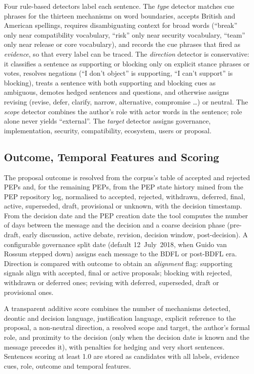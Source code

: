 \documentclass[sigconf,screen]{acmart}
\begin{document}
Four rule-based detectors label each sentence. The \emph{type} detector matches cue phrases for the thirteen mechanisms on word boundaries, accepts British and American spellings, requires disambiguating context for broad words (``break'' only near compatibility vocabulary, ``risk'' only near security vocabulary, ``team'' only near release or core vocabulary), and records the cue phrases that fired as \emph{evidence}, so that every label can be traced. The \emph{direction} detector is conservative: it classifies a sentence as supporting or blocking only on explicit stance phrases or votes, resolves negations (``I don't object'' is supporting, ``I can't support'' is blocking), treats a sentence with both supporting and blocking cues as ambiguous, demotes hedged sentences and questions, and otherwise assigns revising (revise, defer, clarify, narrow, alternative, compromise \ldots) or neutral. The \emph{scope} detector combines the author's role with actor words in the sentence; role alone never yields ``external''. The \emph{target} detector assigns governance, implementation, security, compatibility, ecosystem, users or proposal.

\subsection{Outcome, Temporal Features and Scoring}

The proposal outcome is resolved from the corpus's table of accepted and rejected PEPs and, for the remaining PEPs, from the PEP state history mined from the PEP repository log, normalised to accepted, rejected, withdrawn, deferred, final, active, superseded, draft, provisional or unknown, with the decision timestamp. From the decision date and the PEP creation date the tool computes the number of days between the message and the decision and a coarse decision phase (pre-draft, early discussion, active debate, revision, decision window, post-decision). A configurable governance split date (default 12~July~2018, when Guido van Rossum stepped down) assigns each message to the BDFL or post-BDFL era. Direction is compared with outcome to obtain an \emph{alignment} flag: supporting signals align with accepted, final or active proposals; blocking with rejected, withdrawn or deferred ones; revising with deferred, superseded, draft or provisional ones.

A transparent additive score combines the number of mechanisms detected, deontic and decision language, justification language, explicit reference to the proposal, a non-neutral direction, a resolved scope and target, the author's formal role, and proximity to the decision (only when the decision date is known and the message precedes it), with penalties for hedging and very short sentences. Sentences scoring at least 1.0 are stored as candidates with all labels, evidence cues, role, outcome and temporal features.
\end{document}
